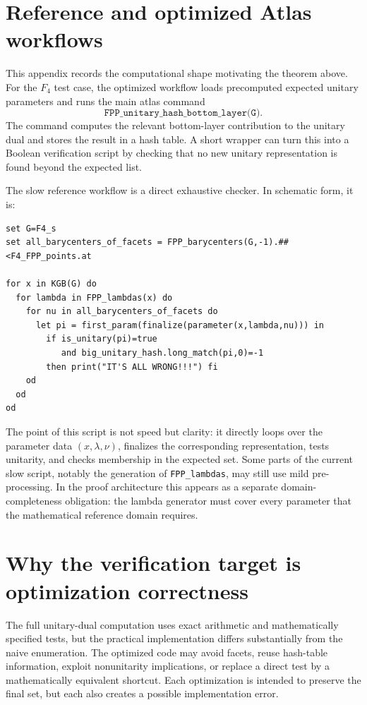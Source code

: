 \documentclass{easychair}
\def\atlas{\textsf{atlas}\xspace}
\begin{document}
\section{Reference and optimized Atlas workflows}

This appendix records the computational shape motivating the theorem above.
For the \(F_4\) test case, the optimized workflow loads precomputed expected
unitary parameters and runs the main \atlas{} command
\[
\texttt{FPP\_unitary\_hash\_bottom\_layer(G)}.
\]
The command computes the relevant bottom-layer contribution to the unitary dual
and stores the result in a hash table.  A short wrapper can turn this into a
Boolean verification script by checking that no new unitary representation is
found beyond the expected list.

The slow reference workflow is a direct exhaustive checker.  In schematic form,
it is:
\begin{verbatim}
set G=F4_s
set all_barycenters_of_facets = FPP_barycenters(G,-1).##
<F4_FPP_points.at

for x in KGB(G) do
  for lambda in FPP_lambdas(x) do
    for nu in all_barycenters_of_facets do
      let pi = first_param(finalize(parameter(x,lambda,nu))) in
        if is_unitary(pi)=true
           and big_unitary_hash.long_match(pi,0)=-1
        then print("IT'S ALL WRONG!!!") fi
    od
  od
od
\end{verbatim}
The point of this script is not speed but clarity: it directly loops over the
parameter data \((x,\lambda,\nu)\), finalizes the corresponding representation,
tests unitarity, and checks membership in the expected set.  Some parts of the
current slow script, notably the generation of \texttt{FPP\_lambdas}, may still
use mild pre-processing.  In the proof architecture this appears as a separate
domain-completeness obligation: the lambda generator must cover every parameter
that the mathematical reference domain requires.

\section{Why the verification target is optimization correctness}

The full unitary-dual computation uses exact arithmetic and mathematically
specified tests, but the practical implementation differs substantially from the
naive enumeration.  The optimized code may avoid facets, reuse hash-table
information, exploit nonunitarity implications, or replace a direct test by a
mathematically equivalent shortcut.  Each optimization is intended to preserve
the final set, but each also creates a possible implementation error.
\end{document}
